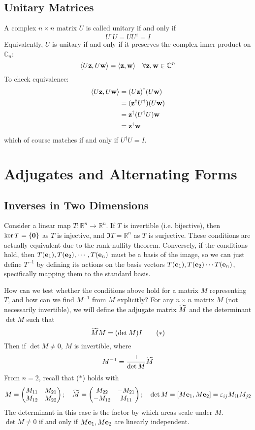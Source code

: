 \documentclass{article}
\begin{document}
\subsection{Unitary Matrices}
A complex $n \times n$ matrix $U$ is called unitary if and only if
\[ U^\dagger U = U U^\dagger = I \]
Equivalently, $U$ is unitary if and only if it preserves the complex inner product on $\mathbb C_n$:
\[ \langle U \vb z, U \vb w \rangle = \langle \vb z, \vb w \rangle\quad \forall \vb z, \vb w \in \mathbb C^n \]
To check equivalence:
\begin{align*}
    \langle U \vb z, U \vb w \rangle & = (U \vb z)^\dagger (U \vb w)         \\
                                     & = (\vb z^\dagger U^\dagger) (U \vb w) \\
                                     & = \vb z^\dagger (U^\dagger U) \vb w   \\
                                     & = \vb z^\dagger \vb w
\end{align*}
which of course matches if and only if $U^\dagger U = I$.

\section{Adjugates and Alternating Forms}
\subsection{Inverses in Two Dimensions}
Consider a linear map $T\colon \mathbb R^n \to \mathbb R^n$. If $T$ is invertible (i.e. bijective), then $\ker T = \{ \vb 0 \}$ as $T$ is injective, and $\Im T = \mathbb R^n$ as $T$ is surjective. These conditions are actually equivalent due to the rank-nullity theorem. Conversely, if the conditions hold, then $T(\vb e_1), T(\vb e_2), \cdots, T(\vb e_n)$ must be a basis of the image, so we can just define $T^{-1}$ by defining its actions on the basis vectors $T(\vb e_1), T(\vb e_2) \cdots T(\vb e_n)$, specifically mapping them to the standard basis.

How can we test whether the conditions above hold for a matrix $M$ representing $T$, and how can we find $M^{-1}$ from $M$ explicitly? For any $n \times n$ matrix $M$ (not necessarily invertible), we will define the adjugate matrix $\widetilde{M}$ and the determinant $\det M$ such that
\[ \widetilde{M} M = (\det M) I \tag{$\ast$} \]
Then if $\det M \neq 0$, $M$ is invertible, where
\[ M^{-1} = \frac{1}{\det M}\widetilde{M} \]
From $n=2$, recall that ($\ast$) holds with
\[ M = \begin{pmatrix}
        M_{11} & M_{21} \\
        M_{12} & M_{22}
    \end{pmatrix};\quad \widetilde{M} = \begin{pmatrix}
        M_{22}  & -M_{21} \\
        -M_{12} & M_{11}
    \end{pmatrix};\quad \det M = [M\vb e_1, M\vb e_2] = \varepsilon_{ij}M_{i1}M_{j2} \]
The determinant in this case is the factor by which areas scale under $M$. $\det M \neq 0$ if and only if $M\vb e_1, M\vb e_2$ are linearly independent.
\end{document}
